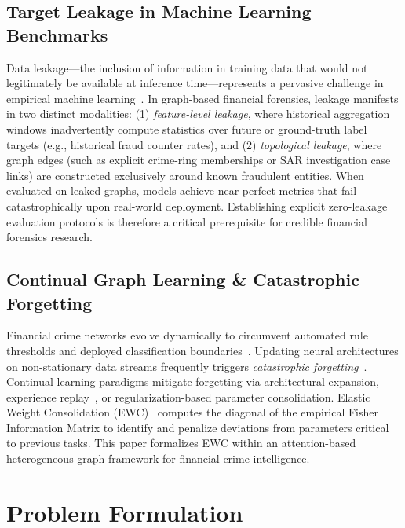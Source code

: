 \documentclass[conference]{IEEEtran}
\begin{document}
\subsection{Target Leakage in Machine Learning Benchmarks}
Data leakage---the inclusion of information in training data that would not legitimately be available at inference time---represents a pervasive challenge in empirical machine learning~\cite{kaufman2012leakage,kapoor2023leakage}. In graph-based financial forensics, leakage manifests in two distinct modalities: (1) \textit{feature-level leakage}, where historical aggregation windows inadvertently compute statistics over future or ground-truth label targets (e.g., historical fraud counter rates), and (2) \textit{topological leakage}, where graph edges (such as explicit crime-ring memberships or SAR investigation case links) are constructed exclusively around known fraudulent entities. When evaluated on leaked graphs, models achieve near-perfect metrics that fail catastrophically upon real-world deployment. Establishing explicit zero-leakage evaluation protocols is therefore a critical prerequisite for credible financial forensics research.

\subsection{Continual Graph Learning \& Catastrophic Forgetting}
Financial crime networks evolve dynamically to circumvent automated rule thresholds and deployed classification boundaries~\cite{wang2020streaming}. Updating neural architectures on non-stationary data streams frequently triggers \textit{catastrophic forgetting}~\cite{kirkpatrick2017overcoming,parisi2019continual,zenke2017continual}. Continual learning paradigms mitigate forgetting via architectural expansion, experience replay~\cite{zhang2022continual}, or regularization-based parameter consolidation. Elastic Weight Consolidation (EWC)~\cite{kirkpatrick2017overcoming} computes the diagonal of the empirical Fisher Information Matrix to identify and penalize deviations from parameters critical to previous tasks. This paper formalizes EWC within an attention-based heterogeneous graph framework for financial crime intelligence.

\section{Problem Formulation}
\label{sec:formulation}
\end{document}
